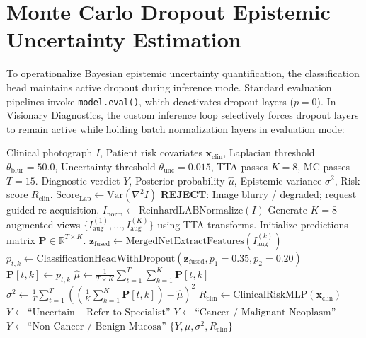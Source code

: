 \documentclass[12pt,a4paper,oneside]{report}
\begin{document}
\section{Monte Carlo Dropout Epistemic Uncertainty Estimation}
\label{sec:mc_dropout_impl}

To operationalize Bayesian epistemic uncertainty quantification, the classification head maintains active dropout during inference mode. Standard evaluation pipelines invoke \texttt{model.eval()}, which deactivates dropout layers ($p = 0$). In Visionary Diagnostics, the custom inference loop selectively forces dropout layers to remain active while holding batch normalization layers in evaluation mode:

\begin{algorithm}[H]
\caption{Quality-Gated Bayesian TTA Ensemble Inference}
\label{alg:bayesian_inference}
\begin{algorithmic}[1]
\Require Clinical photograph $I$, Patient risk covariates $\mathbf{x}_{\text{clin}}$, Laplacian threshold $\theta_{\text{blur}} = 50.0$, Uncertainty threshold $\theta_{\text{unc}} = 0.015$, TTA passes $K = 8$, MC passes $T = 15$.
\Ensure Diagnostic verdict $Y$, Posterior probability $\hat{\mu}$, Epistemic variance $\sigma^2$, Risk score $R_{\text{clin}}$.
\State $\text{Score}_{\text{Lap}} \gets \text{Var}\left( \nabla^2 I \right)$
    \State \Return \textbf{REJECT}: Image blurry / degraded; request guided re-acquisition.
\EndIf
\State $I_{\text{norm}} \gets \text{ReinhardLABNormalize}(I)$
\State Generate $K = 8$ augmented views $\{I_{\text{aug}}^{(1)}, \dots, I_{\text{aug}}^{(K)}\}$ using TTA transforms.
\State Initialize predictions matrix $\mathbf{P} \in \mathbb{R}^{T \times K}$.
 
        \State $\mathbf{z}_{\text{fused}} \gets \text{MergedNetExtractFeatures}(I_{\text{aug}}^{(k)})$
        \State $p_{t,k} \gets \text{ClassificationHeadWithDropout}(\mathbf{z}_{\text{fused}}, p_1=0.35, p_2=0.20)$
        \State $\mathbf{P}[t, k] \gets p_{t,k}$
    \EndFor
\EndFor
\State $\hat{\mu} \gets \frac{1}{T \times K} \sum_{t=1}^T \sum_{k=1}^K \mathbf{P}[t, k]$ 
\State $\sigma^2 \gets \frac{1}{T} \sum_{t=1}^T \left( \left(\frac{1}{K}\sum_{k=1}^K \mathbf{P}[t, k]\right) - \hat{\mu} \right)^2$ 
\State $R_{\text{clin}} \gets \text{ClinicalRiskMLP}(\mathbf{x}_{\text{clin}})$
    \State $Y \gets \text{``Uncertain -- Refer to Specialist''}$
    \State $Y \gets \text{``Cancer / Malignant Neoplasm''}$
\Else
    \State $Y \gets \text{``Non-Cancer / Benign Mucosa''}$
\EndIf
\State \Return $\{Y, \hat{\mu}, \sigma^2, R_{\text{clin}}\}$
\end{algorithmic}
\end{algorithm}
\end{document}
